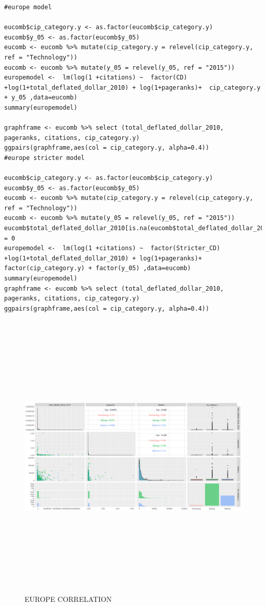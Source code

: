 \documentclass[a4paper,11pt]{article}
\theoremstyle{mytheor}
\begin{document}
\begin{lstlisting}
#europe model

eucomb$cip_category.y <- as.factor(eucomb$cip_category.y)
eucomb$y_05 <- as.factor(eucomb$y_05)
eucomb <- eucomb %>% mutate(cip_category.y = relevel(cip_category.y, ref = "Technology"))
eucomb <- eucomb %>% mutate(y_05 = relevel(y_05, ref = "2015"))
europemodel <-  lm(log(1 +citations) ~  factor(CD) +log(1+total_deflated_dollar_2010) + log(1+pageranks)+  cip_category.y + y_05 ,data=eucomb)
summary(europemodel)

graphframe <- eucomb %>% select (total_deflated_dollar_2010, pageranks, citations, cip_category.y) 
ggpairs(graphframe,aes(col = cip_category.y, alpha=0.4))
#europe stricter model

eucomb$cip_category.y <- as.factor(eucomb$cip_category.y)
eucomb$y_05 <- as.factor(eucomb$y_05)
eucomb <- eucomb %>% mutate(cip_category.y = relevel(cip_category.y, ref = "Technology"))
eucomb <- eucomb %>% mutate(y_05 = relevel(y_05, ref = "2015"))
eucomb$total_deflated_dollar_2010[is.na(eucomb$total_deflated_dollar_2010)] = 0
europemodel <-  lm(log(1 +citations) ~  factor(Stricter_CD) +log(1+total_deflated_dollar_2010) + log(1+pageranks)+  factor(cip_category.y) + factor(y_05) ,data=eucomb)
summary(europemodel)
graphframe <- eucomb %>% select (total_deflated_dollar_2010, pageranks, citations, cip_category.y) 
ggpairs(graphframe,aes(col = cip_category.y, alpha=0.4))
\end{lstlisting}

\begin{figure}[h]
    \centering
    \includegraphics[width=16cm, height=14cm]{eur_nonstrict_cor.png}
    \caption{EUROPE CORRELATION}
    \label{fig:EUROPE CORRELATION}
\end{figure} 
\end{document}
